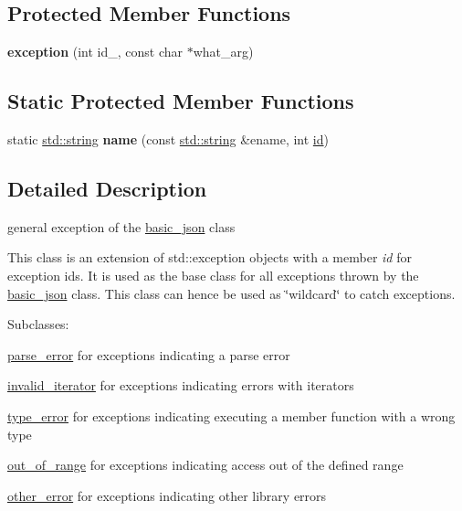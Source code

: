 \subsection*{Protected Member Functions}
\begin{DoxyCompactItemize}
\item 
{\bfseries exception} (int id\+\_\+, const char $\ast$what\+\_\+arg)\hypertarget{classnlohmann_1_1detail_1_1exception_ae323ad0d53bc724414c2233164e65657}{}\label{classnlohmann_1_1detail_1_1exception_ae323ad0d53bc724414c2233164e65657}

\end{DoxyCompactItemize}
\subsection*{Static Protected Member Functions}
\begin{DoxyCompactItemize}
\item 
static \hyperlink{namespacenlohmann_1_1detail_a90aa5ef615aa8305e9ea20d8a947980fab45cffe084dd3d20d928bee85e7b0f21}{std\+::string} {\bfseries name} (const \hyperlink{namespacenlohmann_1_1detail_a90aa5ef615aa8305e9ea20d8a947980fab45cffe084dd3d20d928bee85e7b0f21}{std\+::string} \&ename, int \hyperlink{classnlohmann_1_1detail_1_1exception_a0d4589a3fb54e81646d986c05efa3b9a}{id})\hypertarget{classnlohmann_1_1detail_1_1exception_aac7455bbbaed7c01ecd5a2ead336b1ae}{}\label{classnlohmann_1_1detail_1_1exception_aac7455bbbaed7c01ecd5a2ead336b1ae}

\end{DoxyCompactItemize}


\subsection{Detailed Description}
general exception of the \hyperlink{classnlohmann_1_1basic__json}{basic\+\_\+json} class 

This class is an extension of {\ttfamily std\+::exception} objects with a member {\itshape id} for exception ids. It is used as the base class for all exceptions thrown by the \hyperlink{classnlohmann_1_1basic__json}{basic\+\_\+json} class. This class can hence be used as \char`\"{}wildcard\char`\"{} to catch exceptions.

Subclasses\+:
\begin{DoxyItemize}
\item \hyperlink{classnlohmann_1_1detail_1_1parse__error}{parse\+\_\+error} for exceptions indicating a parse error
\item \hyperlink{classnlohmann_1_1detail_1_1invalid__iterator}{invalid\+\_\+iterator} for exceptions indicating errors with iterators
\item \hyperlink{classnlohmann_1_1detail_1_1type__error}{type\+\_\+error} for exceptions indicating executing a member function with a wrong type
\item \hyperlink{classnlohmann_1_1detail_1_1out__of__range}{out\+\_\+of\+\_\+range} for exceptions indicating access out of the defined range
\item \hyperlink{classnlohmann_1_1detail_1_1other__error}{other\+\_\+error} for exceptions indicating other library errors
\end{DoxyItemize}

